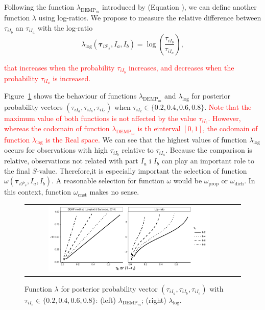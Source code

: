 \documentclass[submit]{smj}
\theoremstyle{definition}
\newcommand{\m}[1]{\boldsymbol{#1}}
\begin{document}
Following the function $\lambda_{\text{DEMP}_m}$ introduced by \cite{longford2014} (Equation \label{lambda_dempM}), we can define another function $\lambda$ using log-ratios. We propose to measure the relative difference between $\tau_{iI_b}$ an $\tau_{iI_a}$ with the log-ratio
\[
\lambda_{\log}(\m\tau_{i \mathcal{P}_s},  I_a,  I_b) = \log \left(\frac{ \tau_{iI_b} }{ \tau_{iI_a} }\right),
\]

\textcolor{red}{that increases when the probability $\tau_{iI_b}$ increases, and decreases when the probability $\tau_{iI_a}$ is increased.}

Figure~\ref{nonsymetric} shows the behaviour of functions $\lambda_{\text{DEMP}_m}$ and $\lambda_{\log}$ for posterior probability vectors $\left(\tau_{iI_a}, \tau_{iI_b}, \tau_{iI_c}\right)$ when $\tau_{iI_c} \in \{0.2, 0.4, 0.6, 0.8\}$. \textcolor{red}{Note that the maximum value of both functions is not affected by the value $\tau_{iI_c}$. However, whereas the codomain of  function $\lambda_{\text{DEMP}_m}$ is th einterval $[0,1]$, the codomain of function $\lambda_{\log}$ is the Real space.} We can see that the highest values of function $\lambda_{\log}$ occurs for observations with high $\tau_{iI_b}$ relative to $\tau_{iI_a}$. Because the comparison is relative, observations not related with part $I_a$ i $I_b$ can play an important role to the final $S$-value. Therefore,it is especially important the selection of function $\omega(\m\tau_{i \mathcal{P}_s},  I_a,  I_b)$. A reasonable selection for function $\omega$ would be $\omega_{\text{prop}}$ or $\omega_{\text{dich}}$. In this context, function $\omega_{\text{cnst}}$ makes no sense.

\begin{figure}[htpb]
\begin{center}
\begin{tabular}{cc}
  \includegraphics[width=0.8\textwidth]{figures/demp2_log.pdf} \\
 \end{tabular}
 \caption{Function $\lambda$ for posterior probability vector $\left(\tau_{iI_a}, \tau_{iI_b}, \tau_{iI_c} \right)$ with $\tau_{iI_c} \in \{0.2, 0.4, 0.6, 0.8\}$: (left) $\lambda_{\text{DEMP}_m}$; (right) $\lambda_{\log}$.} 
\label{nonsymetric}
\end{center}
\end{figure}
\end{document}
